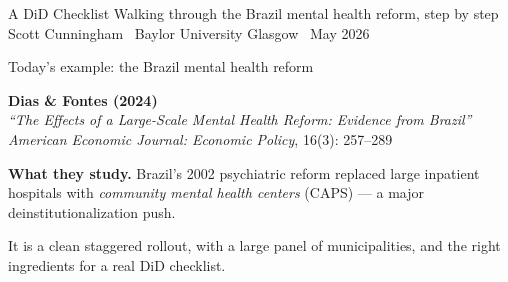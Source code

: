 \documentclass[aspectratio=169,12pt,t]{beamer}
\begin{document}

\remixtitleframe
  {A DiD Checklist}
  {Walking through the Brazil mental health reform, step by step}
  {Scott Cunningham \textperiodcentered\ Baylor University}
  {Glasgow \textperiodcentered\ May 2026}


\begin{frame}{Today's example: the Brazil mental health reform}
\vspace{0.5cm}

\textbf{Dias \& Fontes (2024)} \\
\textit{``The Effects of a Large-Scale Mental Health Reform: Evidence from Brazil''} \\
\textit{American Economic Journal: Economic Policy}, 16(3): 257--289

\vspace{0.7cm}

\textbf{What they study.} \;Brazil's 2002 psychiatric reform replaced large inpatient hospitals with \textit{community mental health centers} (CAPS) --- a major deinstitutionalization push.

\vspace{0.4cm}

 \;It is a clean staggered rollout, with a large panel of municipalities, and the right ingredients for a real DiD checklist.
\end{frame}
\end{document}
